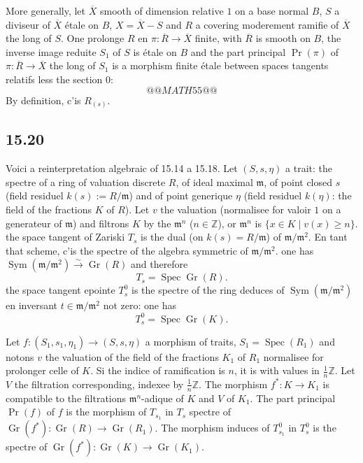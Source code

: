 \documentclass[12pt,a4paper]{article}
\theoremstyle{plain}
\theoremstyle{definition}
\theoremstyle{remark}
\DeclareMathOperator{\Spec}{Spec}
\DeclareMathOperator{\Gr}{Gr}
\DeclareMathOperator{\Sym}{Sym}
\newcommand{\bZ}{\mathbb{Z}}
\begin{document}
More generally, let $\overline{X}$ smooth of dimension relative $1$ on a base normal $B$, $S$ a diviseur of $\overline{X}$ étale on $B$, $X = \overline{X} - S$ and $R$ a covering moderement ramifie of $\overline{X}$ the long of $S$. One prolonge $R$ en $\pi : \overline{R} \to \overline{X}$ finite, with $\overline{R}$ is smooth on $B$, the inverse image reduite $S_1$ of $S$ is étale on $B$ and the part principal $\Pr(\pi)$ of $\pi : \overline{R} \to \overline{X}$ the long of $S_1$ is a morphism finite étale between spaces tangents relatifs less the section $0$:
\[
@@MATH55@@
\]
By definition, c'is $R_{(s)}$.

\subsection*{15.20}

Voici a reinterpretation algebraic of 15.14 a 15.18. Let $(S, s, \eta)$ a trait: the spectre of a ring of valuation discrete $R$, of ideal maximal $\mathfrak{m}$, of point closed $s$ (field residuel $k(s) := R/\mathfrak{m}$) and of point generique $\eta$ (field residuel $k(\eta)$: the field of the fractions $K$ of $R$). Let $v$ the valuation (normalisee for valoir $1$ on a generateur of $\mathfrak{m}$) and filtrons $K$ by the $\mathfrak{m}^n$ ($n \in \bZ$), or $\mathfrak{m}^n$ is $\{x \in K \mid v(x) \geqslant n\}$. the space tangent of Zariski $T_s$ is the dual (on $k(s) = R/\mathfrak{m}$) of $\mathfrak{m}/\mathfrak{m}^2$. En tant that scheme, c'is the spectre of the algebra symmetric of $\mathfrak{m}/\mathfrak{m}^2$. one has $\Sym(\mathfrak{m}/\mathfrak{m}^2) \xrightarrow{\sim} \Gr(R)$ and therefore
\begin{equation}\label{eq:15.20.1}
T_s = \Spec \Gr(R).
\end{equation}
the space tangent epointe $T_s^0$ is the spectre of the ring deduces of $\Sym(\mathfrak{m}/\mathfrak{m}^2)$ en inversant $t \in \mathfrak{m}/\mathfrak{m}^2$ not zero: one has
\begin{equation}\label{eq:15.20.2}
T_s^0 = \Spec \Gr(K).
\end{equation}

Let $f: (S_1, s_1, \eta_1) \to (S, s, \eta)$ a morphism of traits, $S_1 = \Spec(R_1)$ and notons $v$ the valuation of the field of the fractions $K_1$ of $R_1$ normalisee for prolonger celle of $K$. Si the indice of ramification is $n$, it is with values in $\frac{1}{n}\bZ$. Let $V$ the filtration corresponding, indexee by $\frac{1}{n}\bZ$. The morphism $f^*: K \to K_1$ is compatible to the filtrations $\mathfrak{m}^n$-adique of $K$ and $V$ of $K_1$. The part principal $\Pr(f)$ of $f$ is the morphism of $T_{s_1}$ in $T_s$ spectre of $\Gr(f^*): \Gr(R) \to \Gr(R_1)$. The morphism induces of $T_{s_1}^0$ in $T_s^0$ is the spectre of $\Gr(f^*): \Gr(K) \to \Gr(K_1)$.
\end{document}
